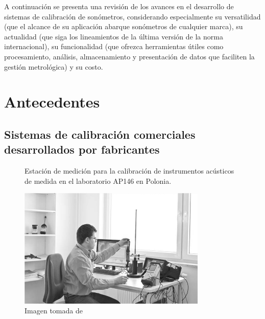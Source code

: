 A continuación se presenta una revisión de los avances en el desarrollo de sistemas de calibración de sonómetros,
considerando especialmente su versatilidad (que el alcance de su aplicación abarque sonómetros de cualquier marca), su
actualidad (que siga los lineamientos de la última versión de la norma internacional), su funcionalidad (que ofrezca
herramientas útiles como procesamiento, análisis, almacenamiento y presentación de datos que faciliten la gestión
metrológica) y su costo.


\section{Antecedentes}

\subsection{Sistemas de calibración comerciales desarrollados por fabricantes}
\begin{figure}[!h]
    \caption{Estación de medición para la calibración de instrumentos acústicos de medida en el laboratorio AP146 en
    Polonia.}
    \label{fig:AP146Laboratory}
    \centering
    \includegraphics[width=0.8\textwidth]{1_Intro/AP146Laboratory}
    \caption*{\footnotesize Imagen tomada de~\cite{Podgorski2016}}
\end{figure}


